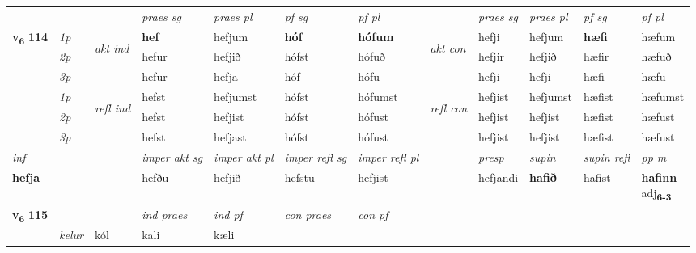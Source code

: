 \begin{longtable}[l]{X>{\footnotesize\itshape}llXXXXlXXXX}
 & &   & \textit{praes sg}  & \textit{praes pl}    & \textit{ pf sg} & \textit{pf pl} & & \textit{praes sg}  & \textit{praes pl}    & \textit{pf sg} & \textit{pf pl }  \\ \cmidrule{4-7} \cmidrule{9-12}
 \multirow{2}{*}{{{\textbf{v{\textsubscript{6}}} \Large{\textbf{114}}}}}  & 1p & \multirow{3}{*}{\begin{turn}{90}\textit{akt ind}\end{turn}} & \textbf{hef} & hefjum & \textbf{hóf} & \textbf{hófum} & \multirow{3}{*}{\begin{turn}{90}\textit{akt con}\end{turn}} &hefji & hefjum & \textbf{hæfi} & hæfum\\*
 & 2p &  &  hefur  & hefjið & hófst & hófuð & & hefjir & hefjið & hæfir & hæfuð \\*
 & 3p &  & hefur & hefja & hóf & hófu & & hefji & hefji& hæfi & hæfu \\*
\cmidrule{4-7} \cmidrule{9-12}
 & 1p & \multirow{3}{*}{\begin{turn}{90}\textit{refl ind}\end{turn}}  & hefst & hefjumst & hófst & hófumst & \multirow{3}{*}{\begin{turn}{90}\textit{refl con}\end{turn}}  &hefjist & hefjumst & hæfist & hæfumst \\*
 & 2p &  & hefst & hefjist & hófst & hófust & &hefjist & hefjist & hæfist & hæfust \\*
 & 3p  & & hefst & hefjast & hófst & hófust & & hefjist & hefjist& hæfist & hæfust \\*
\cmidrule{4-7} \cmidrule{9-12}

   {\textit{inf}} & &  & \textit{imper akt sg} & \textit{imper akt pl} & \textit{imper refl sg} & \textit{imper refl pl} && \textit{presp} & \textit{supin} & \textit{supin refl} & \textit{pp m} \\*
  {\textbf{hefja}} & && hefðu  & hefjið & hefstu & hefjist && hefjandi &  \textbf{hafið} & hafist & \specialcell{\textbf{hafinn} \\ adj\textbf{\textsubscript{6-3}}} \\*

\midrule

\multirow{2}{*}{{{\textbf{v{\textsubscript{6}}} \Large{\textbf{115}}}}}  &&&  \textit{ind praes} & \textit{ind pf} & \textit{con praes} & \textit{con pf} \\*
\multicolumn{3}{r}{\textit{e-n}} & kelur & kól & kali & kæli \\*


\end{longtable}
